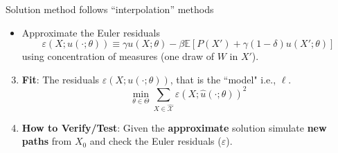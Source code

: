 \documentclass[aspectratio=169,10pt]{beamer}
\newcommand{\emphcolor}[1]{\textbf{\textcolor{emphcolorval}{#1}}}
\newcommand{\expec}[2][]{\ensuremath{\mathbb{E}_{{#1}}\left[ {#2} \right]}}
\newcommand{\Xtrain}{\hat{\mathcal{X}}}
\begin{document}
	\begin{frame}[label= algo]{Solution method follows ``interpolation'' methods}
		\begin{itemize}
			\item Approximate the Euler residuals
			$$\varepsilon\left(X;u(\cdot;\theta)\right) \equiv \gamma u(X;\theta) - \beta \mathbb{E}\left[P(X') +\gamma (1-\delta) u(X';\theta)\right]$$
			\vspace{-0.1in}
			 using concentration of measures (one draw of $W$ in $X'$). \hyperlink{errors}{}
		\end{itemize}
	\begin{enumerate}
		  \setcounter{enumi}{2}
		  \item \emphcolor{Fit}: The residuals $\varepsilon\left(X;u(\cdot;\theta)\right)$, that is the ``model" i.e., $\ell$.
		  $$
		  \min_{\theta \in \Theta} \sum_{X \in \Xtrain} \varepsilon\left(X;\hat{u}(\cdot;\theta)\right)^2
		    $$ 
	    \item  \emphcolor{How to Verify/Test}: Given the \emphcolor{approximate} solution simulate \emphcolor{new paths} from $X_0$ and check the Euler residuals ($\varepsilon$). 
	\end{enumerate}
	\end{frame}

	
	
	
	
\end{document}
